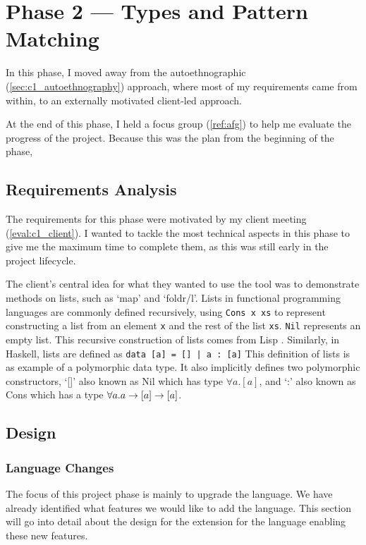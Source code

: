 \chapter{Phase 2 --- Types and Pattern Matching}
In this phase, I moved away from the autoethnographic (\ref{sec:c1_autoethnography}) approach, where most of my requirements came from within, to an externally motivated client-led approach. 


At the end of this phase, I held a focus group (\ref{ref:afg}) to help me evaluate the progress of the project. Because this was the plan from the beginning of the phase, 

\section{Requirements Analysis}
The requirements for this phase were motivated by my client meeting (\ref{eval:c1_client}). I wanted to tackle the most technical aspects in this phase to give me the maximum time to complete them, as this was still early in the project lifecycle. 

The client's central idea for what they wanted to use the tool was to demonstrate methods on lists, such as `map' and `foldr/l'. Lists in functional programming languages are commonly defined recursively, using \verb|Cons x xs| to represent constructing a list from an element \verb|x| and the rest of the list \verb|xs|. \verb|Nil| represents an empty list. This recursive construction of lists comes from Lisp \cite{mccarthy1960recursivelisp}. Similarly, in Haskell, lists are defined as \verb!data [a] = [] | a : [a]! This definition of lists is as example of a polymorphic data type. It also implicitly defines two polymorphic constructors, `[]' also known as Nil which has type $\forall a. [a]$, and `:' also known as Cons which has a type $\forall a. a \rightarrow [a] \rightarrow [a]$. 

\section{Design}
\subsection{Language Changes}
The focus of this project phase is mainly to upgrade the language. We have already identified what features we would like to add the language. This section will go into detail about the design for the extension for the language enabling these new features. 
